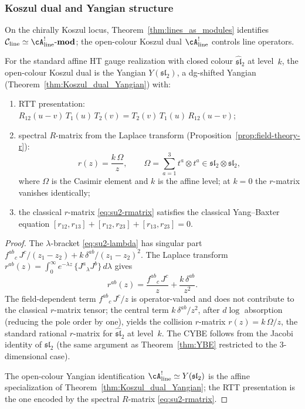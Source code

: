 \subsubsection{Koszul dual and Yangian structure}

On the chirally Koszul locus,
Theorem~\ref{thm:lines_as_modules} identifies
$\mathcal{C}_{\mathrm{line}} \simeq \cA^!_{\mathrm{line}}\text{-}\mathbf{mod}$;
the open-colour Koszul dual $\cA^!_{\mathrm{line}}$ controls line
operators.

\begin{theorem}
\label{thm:su2-yangian}
For the standard affine HT gauge realization with closed colour
$\widehat{\mathfrak{sl}}_2$ at level~$k$, the open-colour Koszul dual is the Yangian
$Y(\mathfrak{sl}_2)$, a dg-shifted Yangian
(Theorem~\ref{thm:Koszul_dual_Yangian}) with:
\begin{enumerate}[label=\textup{(\roman*)}]
\item RTT presentation: $R_{12}(u-v)\, T_1(u)\, T_2(v)
 = T_2(v)\, T_1(u)\, R_{12}(u-v)$;
\item spectral $R$-matrix from the Laplace transform
 (Proposition~\ref{prop:field-theory-r}):
 \begin{equation}\label{eq:su2-rmatrix}
 r(z) = \frac{k\,\Omega}{z},
 \qquad
 \Omega = \sum_{a=1}^3 t^a \otimes t^a
 \in \mathfrak{sl}_2 \otimes \mathfrak{sl}_2,
 \end{equation}
 where $\Omega$ is the Casimir element and $k$ is the affine level; at $k = 0$ the $r$-matrix vanishes identically;
\item the classical $r$-matrix \eqref{eq:su2-rmatrix} satisfies
 the classical Yang--Baxter equation
 $[r_{12}, r_{13}] + [r_{12}, r_{23}] + [r_{13}, r_{23}] = 0$.
\end{enumerate}
\end{theorem}

\begin{proof}
The $\lambda$-bracket \eqref{eq:su2-lambda} has singular part
$f^{ab}{}_c\, J^c / (z_1 - z_2) + k\, \delta^{ab} / (z_1 - z_2)^2$.
The Laplace transform
$r^{ab}(z) = \int_0^\infty e^{-\lambda z}\, \{J^a{}_\lambda J^b\}\, d\lambda$
gives
\[
r^{ab}(z) = \frac{f^{ab}{}_c\, J^c}{z} + \frac{k\, \delta^{ab}}{z^2}.
\]
The field-dependent term $f^{ab}{}_c\, J^c/z$ is operator-valued and
does not contribute to the classical $r$-matrix tensor; the central
term $k\,\delta^{ab}/z^2$, after $d\log$ absorption (reducing the
pole order by one), yields the collision $r$-matrix
$r(z) = k\,\Omega/z$, the standard rational
$r$-matrix for $\widehat{\mathfrak{sl}}_2$ at level~$k$. The CYBE follows from the
Jacobi identity of $\mathfrak{sl}_2$ (the same argument as
Theorem~\ref{thm:YBE} restricted to the $3$-dimensional case).

The open-colour Yangian identification
$\cA^!_{\mathrm{line}} \simeq Y(\mathfrak{sl}_2)$ is the
affine specialization of
Theorem~\ref{thm:Koszul_dual_Yangian}; the RTT presentation is
the one encoded by the spectral $R$-matrix
\eqref{eq:su2-rmatrix}.
\end{proof}

